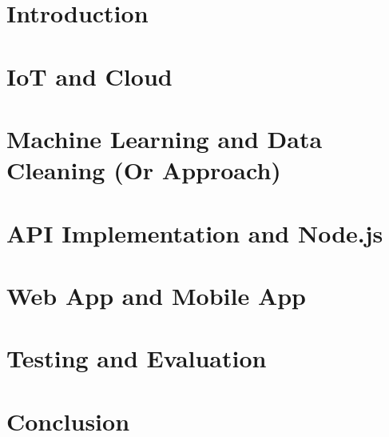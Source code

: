\documentclass[12pt,oneside]{report}
\begin{document}






\tableofcontents




\chapter{Introduction}


\chapter{IoT and Cloud}


\chapter{Machine Learning and Data Cleaning (Or Approach)}


\chapter{API Implementation and Node.js}


\chapter{Web App and Mobile App}


\chapter{Testing and Evaluation}


\chapter{Conclusion}



% 
% 
% 

\end{document}
